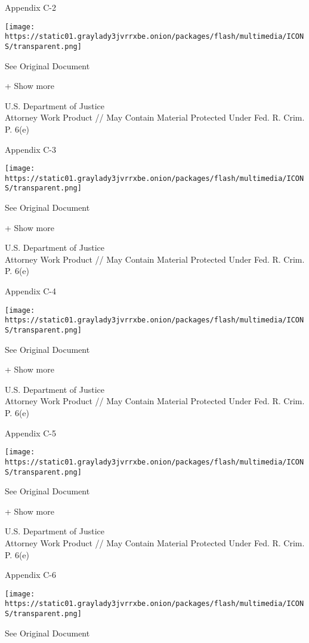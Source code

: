Appendix C-2

\protect\hyperlink{}{}

\texttt{[image: https://static01.graylady3jvrrxbe.onion/packages/flash/multimedia/ICONS/transparent.png]}

See Original Document

+ Show more

U.S. Department of Justice\\
Attorney Work Product // May Contain Material Protected Under Fed. R.
Crim. P. 6(e)

Appendix C-3

\protect\hyperlink{}{}

\texttt{[image: https://static01.graylady3jvrrxbe.onion/packages/flash/multimedia/ICONS/transparent.png]}

See Original Document

+ Show more

U.S. Department of Justice\\
Attorney Work Product // May Contain Material Protected Under Fed. R.
Crim. P. 6(e)

Appendix C-4

\protect\hyperlink{}{}

\texttt{[image: https://static01.graylady3jvrrxbe.onion/packages/flash/multimedia/ICONS/transparent.png]}

See Original Document

+ Show more

U.S. Department of Justice\\
Attorney Work Product // May Contain Material Protected Under Fed. R.
Crim. P. 6(e)

Appendix C-5

\protect\hyperlink{}{}

\texttt{[image: https://static01.graylady3jvrrxbe.onion/packages/flash/multimedia/ICONS/transparent.png]}

See Original Document

+ Show more

U.S. Department of Justice\\
Attorney Work Product // May Contain Material Protected Under Fed. R.
Crim. P. 6(e)

Appendix C-6

\protect\hyperlink{}{}

\texttt{[image: https://static01.graylady3jvrrxbe.onion/packages/flash/multimedia/ICONS/transparent.png]}

See Original Document

